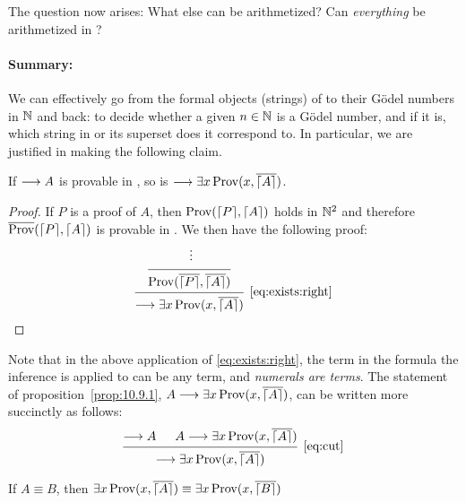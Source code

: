 \documentclass[11pt,a4paper]{article}
\begin{document}
The question now arises: What else can be arithmetized?
Can \emph{everything} be arithmetized in \PA?

\paragraph{Summary:}
We can effectively go from the formal objects (strings)
of \PA{} to their Gödel numbers in \(\mathbb{N}\) and back:
to decide whether a given \(n\in\mathbb{N}\) is a Gödel number,
and if it is, which string in \PA{} or its superset does it correspond to.
In particular, we are justified in making the following claim.

\begin{proposition}[10.9.1]\label{prop:10.9.1}
    If \(\longrightarrow A\) is provable in \PA,
    so is \(\longrightarrow\exists x\operatorname{Prov}(x,\overline{\lceil A\rceil})\).
\end{proposition}

\begin{proof}
    If \(P\) is a proof of \(A\), then \(\operatorname{Prov}(\lceil P\rceil, \lceil A\rceil)\)
    holds in \(\mathbb{N}^2\) and therefore \(\overline{\operatorname{Prov}}(\lceil P\rceil, \lceil A\rceil)\)
    is provable in \PA. We then have the following proof:
    \begin{equation*}
        \begin{prooftree}
            \hypo{}
            \ellipsis{}{}
            \infer1{\Prov(\num{\G P},\num{\G A})}
            \infer1[\eqref{eq:exists:right}]{\seq\exists x\Prov(x,\num{\G A})}
        \end{prooftree}
    \end{equation*}
\end{proof}

Note that in the above application of \eqref{eq:exists:right},
the term in the formula the inference is applied to can be any term,
and \emph{numerals are terms}. The statement of proposition~\ref{prop:10.9.1},
\(A\longrightarrow\exists x\operatorname{Prov}(x,\overline{\lceil A\rceil})\),
can be written more succinctly as follows:
\begin{equation*}
    \begin{prooftree}
        \hypo{\seq A}
        \hypo{A\seq\exists x\Prov(x,\num{\G A})}
        \infer2[\eqref{eq:cut}]{\seq\exists x\Prov(x,\num{\G A})}
    \end{prooftree}
\end{equation*}

\begin{proposition}[10.9.2]\label{prop:10.9.2}
    If \(A\equiv B\), then \(\exists x\operatorname{Prov}(x,\overline{\lceil A\rceil})\equiv\exists x\operatorname{Prov}(x,\overline{\lceil B\rceil})\)
\end{proposition}
\end{document}
